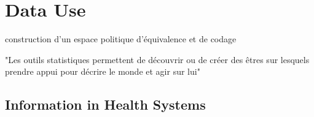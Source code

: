 \section{Data Use}

construction d'un espace politique d'équivalence et de codage


"Les outils statistiques permettent de découvrir ou de créer des êtres sur lesquels prendre appui pour décrire le monde et agir sur lui"

\subsection{Information in Health Systems}




